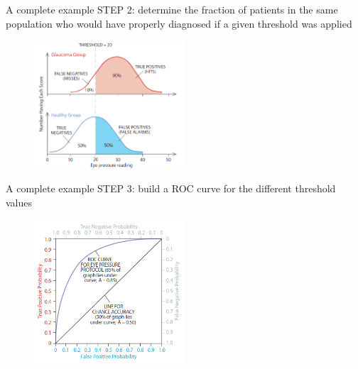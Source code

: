 \documentclass{beamer}
\begin{document}
\begin{frame}{A complete example\cite{swetsBetterDecisionsScience2000}}
  STEP 2: determine the fraction of patients in the same population who would have properly diagnosed if a given threshold was applied
  \begin{figure}
    \includegraphics[width=0.5\textwidth]{ROCEx2}
  \end{figure}
\end{frame}

\begin{frame}{A complete example\cite{swetsBetterDecisionsScience2000}}
  STEP 3: build a ROC curve for the different threshold values
  \begin{figure}
    \includegraphics[width=0.5\textwidth]{ROCEx3}
  \end{figure}
\end{frame}
\end{document}

